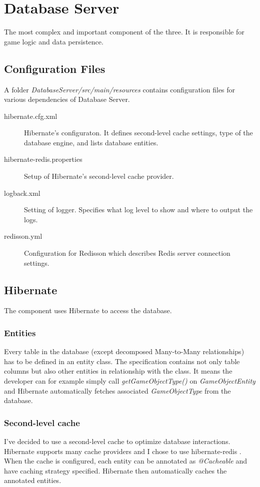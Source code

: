 \section{Database Server}
The most complex and important component of the three. It is responsible for game logic and data persistence.

\subsection{Configuration Files}
A folder \textit{DatabaseServer/src/main/resources} contains configuration files for various dependencies of Database Server.
\begin{description}
	\item[hibernate.cfg.xml] Hibernate's configuraton. It defines second-level cache settings, type of the database engine, and lists database entities.
	\item[hibernate-redis.properties] Setup of Hibernate's second-level cache provider.
	\item[logback.xml] Setting of logger. Specifies what log level to show and where to output the logs.
	\item[redisson.yml] Configuration for Redisson which describes Redis server connection settings. 
\end{description}

\subsection{Hibernate}
The component uses Hibernate to access the database.

\subsubsection{Entities}
Every table in the database (except decomposed Many-to-Many relationships) has to be defined in an entity class. The specification contains not only table columns but also other entities in relationship with the class. It means the developer can for example simply call \textit{getGameObjectType()} on \textit{GameObjectEntity} and Hibernate automatically fetches associated \textit{GameObjectType} from the database.

\subsubsection{Second-level cache}
I've decided to use a second-level cache to optimize database interactions. Hibernate supports many cache providers and I chose to use hibernate-redis \cite{hibernateredis}. When the cache is configured, each entity can be annotated as \textit{@Cacheable} and have caching strategy specified. Hibernate then automatically caches the annotated entities.

